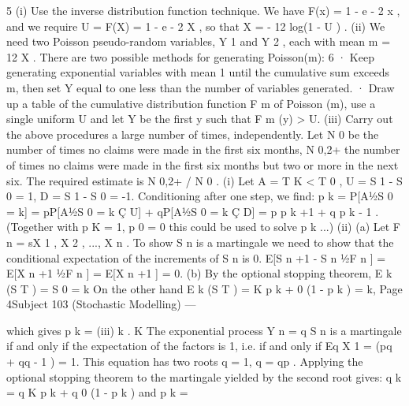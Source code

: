 5
(i)
Use the inverse distribution function technique.
We have F(x) = 1 - e - 2 x , and we require U = F(X) = 1 - e - 2 X , so that
X = - 12 log(1 - U ) .
(ii)
We need two Poisson pseudo-random variables, Y 1 and Y 2 , each with
mean m = 12 X .
There are two possible methods for generating Poisson(m):
6
· Keep generating exponential variables with mean 1 until the
cumulative sum exceeds m, then set Y equal to one less than the
number of variables generated.
· Draw up a table of the cumulative distribution function F m of Poisson (m), use a single uniform U and let Y be the first y such
that F m (y) > U.
(iii) Carry out the above procedures a large number of times, independently.
Let N 0 be the number of times no claims were made in the first six
months, N 0,2+ the number of times no claims were made in the first six months but two or more in the next six. The required estimate is
N 0,2+ / N 0 .
(i) Let A = {T K < T 0 }, U = {S 1 - S 0 = 1}, D = {S 1 - S 0 = -1}. Conditioning after
one step, we find:
p k = P[A1⁄2S 0 = k] = pP[A1⁄2S 0 = k Ç U] + qP[A1⁄2S 0 = k Ç D] = p p k +1 + q p k - 1 .
(Together with p K = 1, p 0 = 0 this could be used to solve p k ...)
(ii)
(a)
Let F n = s{X 1 , X 2 , ..., X n }. To show S n is a martingale we need to
show that the conditional expectation of the increments of S n is 0.
E[S n +1 - S n 1⁄2F n ] = E[X n +1 1⁄2F n ] = E[X n +1 ] = 0.
(b)
By the optional stopping theorem,
E k (S T ) = S 0 = k
On the other hand
E k (S T ) = K p k + 0 (1 - p k ) = k,
Page 4Subject 103 (Stochastic Modelling) — 

which gives
p k =
(iii)
k
.
K
The exponential process Y n = q S n is a martingale if and only if the
expectation of the factors is 1, i.e. if and only if Eq X 1 = (pq + qq - 1 ) = 1. This
equation has two roots q = 1, q = qp .
Applying the optional stopping theorem to the martingale yielded by the
second root gives: q k = q K p k + q 0 (1 - p k ) and p k =

